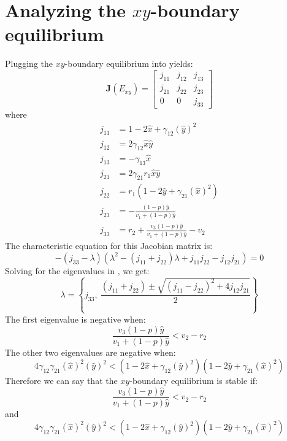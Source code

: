\section{Analyzing the $xy$-boundary equilibrium}\label{sec:stability_xy_boundary_equilibrium}
Plugging the $xy$-boundary equilibrium into  yields:
\begin{equation}
    \textbf{J}\left(E_{xy}\right)=\begin{bmatrix}
        j_{11} & j_{12} & j_{13}\\
        j_{21} & j_{22} & j_{23}\\
        0 & 0 & j_{33}
    \end{bmatrix}
    \label{eq:5.10}
\end{equation}
where
\begin{align*}
    j_{11} &= 1-2\hat{x}+\gamma_{12}\left(\hat{y}\right)^2\\
    j_{12} &= 2\gamma_{12}\hat{x}\hat{y}\\
    j_{13} &= -\gamma_{13}\hat{x}\\
    j_{21} &= 2\gamma_{21}r_1\hat{x}\hat{y}\\
    j_{22} &= r_1\left(1-2\hat{y}+\gamma_{21}\left(\hat{x}\right)^2\right)\\
    j_{23} &= -\frac{\left(1-p\right)\hat{y}}{v_1+\left(1-p\right)\hat{y}}\\
    j_{33} &= r_2+\frac{v_3\left(1-p\right)\hat{y}}{v_1+\left(1-p\right)\hat{y}}-v_2
\end{align*}
The characteristic equation for this Jacobian matrix is:
\begin{equation}
    -\left(j_{33}-\lambda\right)\left(\lambda^2-\left(j_{11}+j_{22}\right)\lambda+j_{11}j_{22}-j_{12}j_{21}\right)=0
    \label{eq:5.11}
\end{equation}
Solving for the eigenvalues in , we get:
\[
\lambda=\left\{
j_{33},\ 
\frac{\left(j_{11}+j_{22}\right) \pm \sqrt{\left(j_{11}-j_{22}\right)^2+4j_{12}j_{21}}}{2}
\right\}
\]
The first eigenvalue is negative when:
\[
\frac{v_3\left(1-p\right)\hat{y}}{v_1+\left(1-p\right)\hat{y}}<v_2-r_2
\]
The other two eigenvalues are negative when:
\[
4\gamma_{12}\gamma_{21}\left(\hat{x}\right)^2\left(\hat{y}\right)^2<\left(1-2\hat{x}+\gamma_{12}\left(\hat{y}\right)^2\right)\left(1-2\hat{y}+\gamma_{21}\left(\hat{x}\right)^2\right)
\]
Therefore we can say that the $xy$-boundary equilibrium is stable if:
\[
\frac{v_3\left(1-p\right)\hat{y}}{v_1+\left(1-p\right)\hat{y}}<v_2-r_2
\]
and
\[
4\gamma_{12}\gamma_{21}\left(\hat{x}\right)^2\left(\hat{y}\right)^2<\left(1-2\hat{x}+\gamma_{12}\left(\hat{y}\right)^2\right)\left(1-2\hat{y}+\gamma_{21}\left(\hat{x}\right)^2\right)
\]

